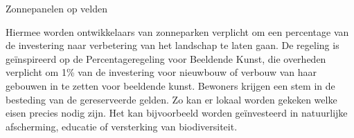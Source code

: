 \begin{voorstel}{Zonnepanelen op velden}
\begin{multicols}{2}
\begin{aanbevelingen}
Hiermee worden ontwikkelaars van zonneparken verplicht om een percentage van de investering naar verbetering van het landschap te laten gaan. De regeling is geïnspireerd op de Percentageregeling voor Beeldende Kunst, die overheden verplicht om 1\% van de investering voor nieuwbouw of verbouw van haar gebouwen in te zetten voor beeldende kunst.
Bewoners krijgen een stem in de besteding van de gereserveerde gelden.
Zo kan er lokaal worden gekeken welke eisen precies nodig zijn.
Het kan bijvoorbeeld worden geïnvesteerd in natuurlijke afscherming, educatie of versterking van biodiversiteit.

\end{aanbevelingen}

\end{multicols}

\end{voorstel}



